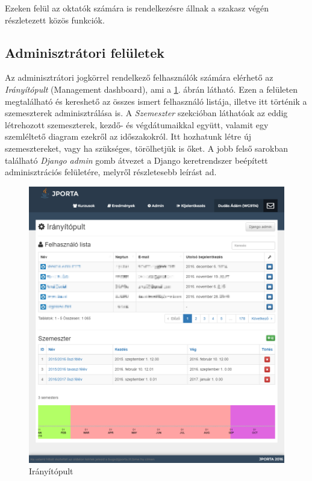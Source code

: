 Ezeken felül az oktatók számára is rendelkezésre állnak a szakasz végén részletezett közös funkciók.

\subsection{Adminisztrátori felületek}
Az adminisztrátori jogkörrel rendelkező felhasználók számára elérhető az \textit{Irányítópult} (Management dashboard), ami a \ref{figure:jporta-management-dashboard}. ábrán látható.
Ezen a felületen megtalálható és kereshető az összes ismert felhasználó listája, illetve itt történik a szemeszterek adminisztrálása is.
A \textit{Szemeszter} szekcióban láthatóak az eddig létrehozott szemeszterek, kezdő- és végdátumaikkal együtt, valamit egy szemléltető diagram ezekről az időszakokról.
Itt hozhatunk létre új szemesztereket, vagy ha szükséges, törölhetjük is őket. 
A jobb felső sarokban található \textit{Django admin} gomb átvezet a Django keretrendszer beépített adminisztrációs felületére, melyről részletesebb leírást \cite{DjangoAdmin} ad.
\begin{figure}[h]
    \centering
    \includegraphics[width=\textwidth]{figures/Jporta-management-dashboard}
    \caption{Irányítópult}
    \label{figure:jporta-management-dashboard}
\end{figure}

